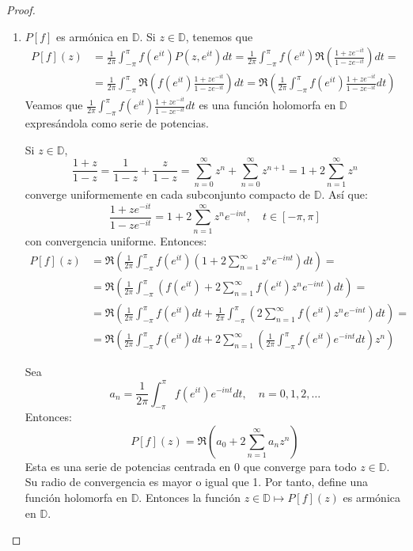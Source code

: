 \begin{proof}
    \hfill
    \begin{enumerate}
        \item $P[f]$ es armónica en $\mathbb{D}$.
              Si $z \in \mathbb{D}$, tenemos que
              \begin{align*}
                  P[f](z) & = \frac{1}{2\pi} \int_{-\pi}^\pi f(e^{it})P(z, e^{it})dt = \frac{1}{2\pi} \int_{-\pi}^\pi f(e^{it})\Re\left(\frac{1+ze^{-it}}{1-ze^{-it}}\right)dt =                                \\
                          & = \frac{1}{2\pi} \int_{-\pi}^\pi \Re\left(f(e^{it})\frac{1+ze^{-it}}{1-ze^{-it}}\right)dt = \Re\left(\frac{1}{2\pi} \int_{-\pi}^\pi f(e^{it})\frac{1+ze^{-it}}{1-ze^{-it}}dt\right)
              \end{align*}
              Veamos que $\frac{1}{2\pi} \int_{-\pi}^\pi f(e^{it})\frac{1+ze^{-it}}{1-ze^{-it}}dt$ es una función holomorfa en $\mathbb{D}$ expresándola como serie de potencias.

              Si $z \in \mathbb{D}$,
              $$\frac{1+z}{1-z} = \frac{1}{1-z} + \frac{z}{1-z} = \sum_{n=0}^\infty z^n + \sum_{n=0}^\infty z^{n+1} = 1 + 2\sum_{n=1}^\infty z^n$$
              converge uniformemente en cada subconjunto compacto de $\mathbb{D}$.
              Así que:
              $$\frac{1+ze^{-it}}{1-ze^{-it}} = 1 + 2\sum_{n=1}^\infty z^ne^{-int}, \quad t \in [-\pi, \pi]$$
              con convergencia uniforme.
              Entonces:
              \begin{align*}
                  P[f](z) & = \Re\left(\frac{1}{2\pi} \int_{-\pi}^\pi f(e^{it})\left(1 + 2\sum_{n=1}^\infty z^ne^{-int}\right)dt\right) =                                          \\
                          & = \Re\left(\frac{1}{2\pi} \int_{-\pi}^\pi \left(f(e^{it}) + 2\sum_{n=1}^\infty f(e^{it})z^ne^{-int}\right)dt\right) =                                  \\
                          & = \Re\left(\frac{1}{2\pi} \int_{-\pi}^\pi f(e^{it})dt + \frac{1}{2\pi} \int_{-\pi}^\pi \left(2\sum_{n=1}^\infty f(e^{it})z^ne^{-int}\right)dt\right) = \\
                          & = \Re\left(\frac{1}{2\pi} \int_{-\pi}^\pi f(e^{it})dt + 2\sum_{n=1}^\infty\left(\frac{1}{2\pi} \int_{-\pi}^\pi f(e^{it})e^{-int}dt\right)z^n\right)
              \end{align*}

              Sea
              $$a_n = \frac{1}{2\pi} \int_{-\pi}^\pi f(e^{it})e^{-int}dt, \quad n = 0, 1, 2, \dots$$
              Entonces:
              $$P[f](z) = \Re\left(a_0 + 2\sum_{n=1}^\infty a_nz^n\right)$$
              Esta es una serie de potencias centrada en 0 que converge para todo $z \in \mathbb{D}$.
              Su radio de convergencia es mayor o igual que 1.
              Por tanto, define una función holomorfa en $\mathbb{D}$.
              Entonces la función $z \in \mathbb{D} \mapsto P[f](z)$ es armónica en $\mathbb{D}$.


\end{enumerate}
\end{proof}
